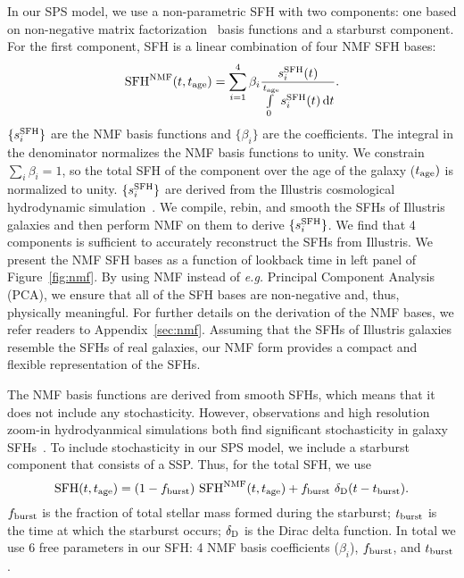 In our SPS model, we use a non-parametric SFH with two components: one based on
non-negative matrix factorization~\citep[NMF;][]{lee1999,cichocki2009,
fevotte2011} basis functions and a starburst component.
For the first component, SFH is a linear combination of four NMF SFH bases:
\begin{equation} \label{eq:nmf} 
    {\rm SFH}^{\rm NMF} (t, t_{\rm age}) = \sum\limits_{i=1}^{4} \beta_i
    \frac{s_i^{\rm SFH}(t)}{\int\limits_0^{t_{\rm age}} s_i^{\rm SFH}(t) \,
    {\rm d}t}. 
\end{equation} 
$\{s^{\rm SFH}_i\}$ are the NMF basis functions and $\{\beta_i\}$ are the
coefficients. 
The integral in the denominator normalizes the NMF basis functions to unity. 
We constrain $\sum_i \beta_i = 1$, so the total SFH of the component over the
age of the galaxy ($t_{\rm age})$ is normalized to unity.
$\{s^{\rm SFH}_i\}$ are derived from the Illustris cosmological hydrodynamic
simulation~\citep{vogelsberger2014, genel2014, nelson2015}.
We compile, rebin, and smooth the SFHs of Illustris galaxies and then perform
NMF on them to derive $\{s^{\rm SFH}_i\}$. 
We find that 4 components is sufficient to accurately reconstruct the SFHs
from Illustris. 
We present the NMF SFH bases as a function of lookback time in
left panel of Figure~\ref{fig:nmf}.
By using NMF instead of \emph{e.g.} Principal Component Analysis (PCA), we
ensure that all of the SFH bases are non-negative and, thus, physically
meaningful. 
For further details on the derivation of the NMF bases, we refer readers to
Appendix~\ref{sec:nmf}. 
Assuming that the SFHs of Illustris galaxies resemble the SFHs of real
galaxies, our NMF form provides a compact and flexible representation of the
SFHs. 

The NMF basis functions are derived from smooth SFHs, which means that it does
not include any stochasticity. 
However, observations and high resolution zoom-in hydrodyanmical simulations
both find significant stochasticity in galaxy SFHs~\citep{sparre2017,
caplar2019, hahn2019b, iyer2020}. 
To include stochasticity in our SPS model, we include a starburst component
that consists of a SSP. 
Thus, for the total SFH, we use
\begin{equation} \label{eq:sfh}
    {\rm SFH} (t, t_{\rm age}) = (1 - f_{\rm burst})~{\rm SFH}^{\rm NMF} (t,
    t_{\rm age}) + f_{\rm burst}~\delta_{\rm D}(t - t_{\rm burst}).
\end{equation}
$f_{\rm burst}$ is the fraction of total stellar mass formed during the
starburst; $t_{\rm burst}$ is the time at which the starburst occurs; 
$\delta_{\rm D}$ is the Dirac delta function.
In total we use 6 free parameters in our SFH: 4 NMF basis coefficients 
($\beta_i$), $f_{\rm burst}$, and $t_{\rm burst}$. 

